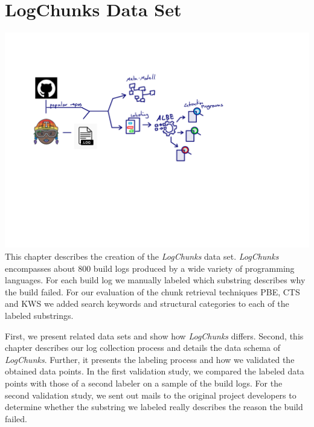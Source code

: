 \documentclass[\myrootdir/main.tex]{subfiles}
\begin{document}
\chapter{LogChunks Data Set}
\label{sec:data-set}
\includegraphics[page=5, width=\textwidth, trim={0.5cm 0.5cm 0.5cm 0.5cm}, clip]{img/flow-of-research.pdf}
This chapter describes the creation of the \emph{LogChunks} data set.
\emph{LogChunks} encompasses about 800 build logs produced by a wide variety of programming languages.
For each build log we manually labeled which substring describes why the build failed.
For our evaluation of the chunk retrieval techniques PBE, CTS and KWS we added search keywords and structural categories to each of the labeled substrings.

First, we present related data sets and show how \emph{LogChunks} differs.
Second, this chapter describes our log collection process and details the data schema of \emph{LogChunks}.
Further, it presents the labeling process and how we validated the obtained data points.
In the first validation study, we compared the labeled data points with those of a second labeler on a sample of the build logs.
For the second validation study, we sent out mails to the original project developers to determine whether the substring we labeled really describes the reason the build failed.
\end{document}
